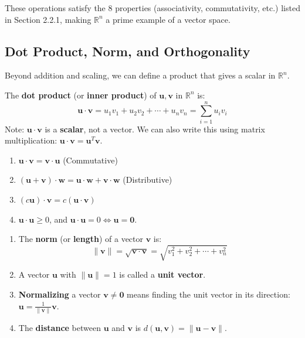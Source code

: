 These operations satisfy the 8 properties (associativity, commutativity, etc.) listed in Section 2.2.1, making $\mathbb{R}^n$ a prime example of a vector space.

\subsection{Dot Product, Norm, and Orthogonality}

Beyond addition and scaling, we can define a product that gives a scalar in $\mathbb{R}^n$.

\begin{definition}
The \textbf{dot product} (or \textbf{inner product}) of $\mathbf{u}, \mathbf{v}$ in $\mathbb{R}^n$ is:
\[ \mathbf{u} \cdot \mathbf{v} = u_1v_1 + u_2v_2 + \cdots + u_nv_n = \sum_{i=1}^n u_i v_i \]
Note: $\mathbf{u} \cdot \mathbf{v}$ is a \textbf{scalar}, not a vector.
We can also write this using matrix multiplication: $\mathbf{u} \cdot \mathbf{v} = \mathbf{u}^T \mathbf{v}$.
\end{definition}

\begin{property}
\begin{enumerate}
    \item $\mathbf{u} \cdot \mathbf{v} = \mathbf{v} \cdot \mathbf{u}$ (Commutative)
    \item $(\mathbf{u} + \mathbf{v}) \cdot \mathbf{w} = \mathbf{u} \cdot \mathbf{w} + \mathbf{v} \cdot \mathbf{w}$ (Distributive)
    \item $(c\mathbf{u}) \cdot \mathbf{v} = c(\mathbf{u} \cdot \mathbf{v})$
    \item $\mathbf{u} \cdot \mathbf{u} \ge 0$, and $\mathbf{u} \cdot \mathbf{u} = 0 \iff \mathbf{u} = \mathbf{0}$.
\end{enumerate}
\end{property}

\begin{definition}
\begin{enumerate}
    \item The \textbf{norm} (or \textbf{length}) of a vector $\mathbf{v}$ is:
    \[ \|\mathbf{v}\| = \sqrt{\mathbf{v} \cdot \mathbf{v}} = \sqrt{v_1^2 + v_2^2 + \cdots + v_n^2} \]
    \item A vector $\mathbf{u}$ with $\|\mathbf{u}\| = 1$ is called a \textbf{unit vector}.
    \item \textbf{Normalizing} a vector $\mathbf{v} \neq \mathbf{0}$ means finding the unit vector in its direction: $\mathbf{u} = \frac{1}{\|\mathbf{v}\|} \mathbf{v}$.
    \item The \textbf{distance} between $\mathbf{u}$ and $\mathbf{v}$ is $d(\mathbf{u}, \mathbf{v}) = \|\mathbf{u} - \mathbf{v}\|$.
\end{enumerate}
\end{definition}

